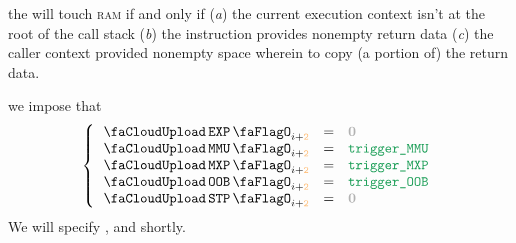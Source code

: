 \begin{description}
\begin{enumerate}
				the \zkEvm{} will touch \textsc{ram} if and only if
				(\emph{a}) the current execution context isn't at the root of the call stack
				(\emph{b}) the  instruction provides nonempty return data
				(\emph{c}) the caller context provided nonempty space wherein to copy (a portion of) the return data.
		\end{enumerate}
	\item[\underline{Setting the miscellaneous-row $n^°(i + \locFirstMiscRowOffset)$:}]
		we impose that
		\[
			\left\{ \begin{array}{lclr}
				\miscExpFlag  _{i + \locFirstMiscRowOffset} & = & \gZero         \\
				\miscMmuFlag  _{i + \locFirstMiscRowOffset} & = & \locTriggerMmu \\
				\miscMxpFlag  _{i + \locFirstMiscRowOffset} & = & \locTriggerMxp \\
				\miscOobFlag  _{i + \locFirstMiscRowOffset} & = & \locTriggerOob \\
				\miscStpFlag  _{i + \locFirstMiscRowOffset} & = & \gZero         \\
			\end{array} \right.
		\]
		\saNote{}
		We will specify \locTriggerMmu{}, \locTriggerMxp{} and \locTriggerOob{} shortly.


\end{description}
